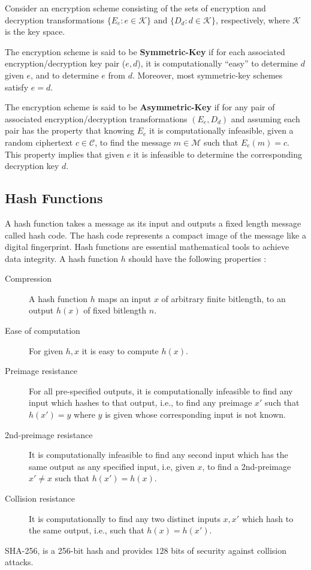 \documentclass[%
  slidesonly,%
  semlayer%
  ]{seminar}                                  %
\begin{document}
\begin{slide}
    Consider an encryption scheme consisting of the sets of encryption and decryption transformations $\{E_{e}: e \in \mathcal{K}\}$ and $\{D_{d}: d \in \mathcal{K}\}$, respectively, where $\mathcal{K}$ is the key space.

    The encryption scheme is said to be \textbf{Symmetric-Key} if for each associated encryption/decryption key pair ($e,d$), it is computationally ``easy'' to determine $d$ given $e$, and to determine $e$ from $d$.
    Moreover, most symmetric-key schemes satisfy $e = d$.
    
    The encryption scheme is said to be \textbf{Asymmetric-Key} if for any pair of associated encryption/decryption transformations $(E_{e},D_{d})$ and assuming each pair has the property that knowing $E_{e}$ it is computationally infeasible, given a random ciphertext $c \in \mathcal{C}$, to find the message $m \in \mathcal{M}$ such that $E_{e}(m) = c$.
    This property implies that given $e$ it is infeasible to determine the corresponding decryption key $d$.

    \clearpage

  \subsection*{Hash Functions}
    A hash function takes a message as its input and outputs a fixed length message called hash code.
    The hash code represents a compact image of the message like a digital fingerprint.
    Hash functions are essential mathematical tools to achieve data integrity.
    A hash function $h$ should have the following properties :
    \begin{description}
      \item [Compression] A hash function $h$ maps an input $x$ of arbitrary finite bitlength, to an output $h(x)$ of fixed bitlength $n$.
      \item [Ease of computation] For given $h,x$ it is easy to compute $h(x)$.
      \item [Preimage resistance] For all pre-specified outputs, it is computationally infeasible to find any input which hashes to that output, i.e., to find any preimage $x'$ such that $h(x') = y$ where $y$ is given whose corresponding input is not known.
      \item [2nd-preimage resistance] It is computationally infeasible to find any second input which has the same output as any specified input, i.e, given $x$, to find a 2nd-preimage $x' \neq x$ such that $h(x') = h(x)$.
      \item [Collision resistance] It is computationally to find any two distinct inputs $x,x'$ which hash to the same output, i.e., such that $h(x) = h(x')$.
    \end{description}
    SHA-256, is a 256-bit hash and provides $128$ bits of security against collision attacks.


\end{slide}
\end{document}
